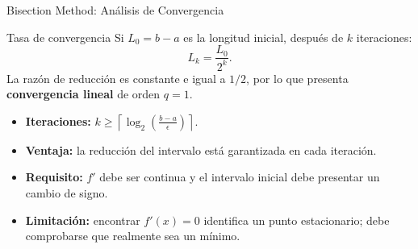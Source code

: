 \begin{frame}{Bisection Method: Análisis de Convergencia}
    \begin{alertblock}{Tasa de convergencia}
        \footnotesize
        Si $L_0=b-a$ es la longitud inicial, después de $k$ iteraciones:
        \[
            L_k=\frac{L_0}{2^k}.
        \]
        La razón de reducción es constante e igual a $1/2$, por lo que
        presenta \textbf{convergencia lineal} de orden $q=1$.
    \end{alertblock}

    \scriptsize
    \begin{itemize}
        \item \textbf{Iteraciones:}
        $k \ge
        \left\lceil
        \log_2\!\left(\frac{b-a}{\epsilon}\right)
        \right\rceil$.

        \item \textbf{Ventaja:} la reducción del intervalo está garantizada
        en cada iteración.

        \item \textbf{Requisito:} $f'$ debe ser continua y el intervalo inicial
        debe presentar un cambio de signo.

        \item \textbf{Limitación:} encontrar $f'(x)=0$ identifica un punto
        estacionario; debe comprobarse que realmente sea un mínimo.
    \end{itemize}
\end{frame}